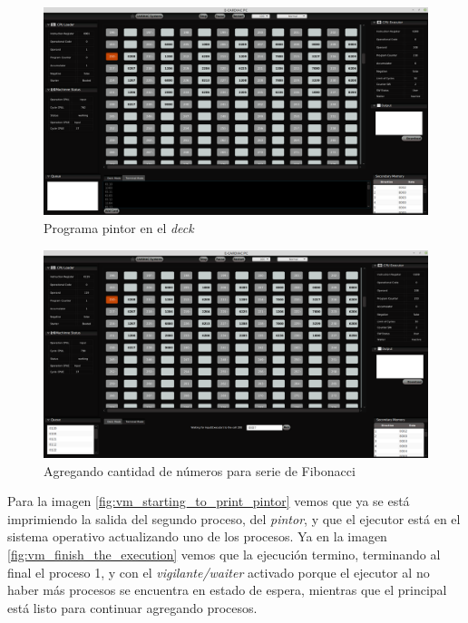 \documentclass[letterpaper,12pt,oneside]{book}
\begin{document}
			\begin{figure}[H]		
				\centering
				\includegraphics[scale=0.26]{media/Paralela/vm_add_pintor_deck.png}
				\caption{Programa pintor en el \textit{deck}} 
				\label{fig:vm_add_pintor_deck}
			\end{figure}
			
			\begin{figure}[h]		
				\centering
				\includegraphics[scale=0.26]{media/Paralela/vm_fibonacci_putting_numer_of_digits.png}
				\caption{Agregando cantidad de números para serie de Fibonacci}
				\label{fig:vm_fibonacci_putting_numer_of_digits}
			\end{figure}
			
			
			Para la imagen \ref{fig:vm_starting_to_print_pintor} vemos que ya se está imprimiendo la salida del segundo proceso, del \textit{pintor}, y
			que el ejecutor está en el sistema operativo actualizando uno de los procesos. Ya en la imagen 
			\ref{fig:vm_finish_the_execution} vemos que la ejecución termino, terminando al final el proceso 1, y con el \textit{vigilante/waiter}
			activado porque el ejecutor al no haber más procesos se encuentra en estado de espera, mientras que el principal
			está listo para continuar agregando procesos. 
			
\end{document}
